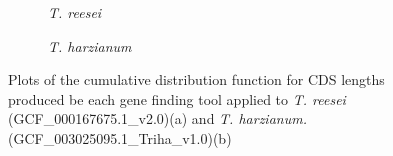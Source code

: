 \begin{figure}
  \centering
  \begin{subfigure}{\textwidth}
    \label{fig:treesei-lengths}
    \caption{\textit{T. reesei}}
  \end{subfigure}
  \begin{subfigure}{\textwidth}
    \label{fig:tharzianum-lengths}
    \caption{\textit{T. harzianum}}
  \end{subfigure}
  \caption[CDF plots for \textit{T. harzianum} and \textit{T. reesei}]{Plots of the cumulative distribution
    function for CDS lengths produced be each gene finding tool
    applied to \textit{T. reesei} (GCF\_000167675.1\_v2.0)(a) and
    \textit{T. harzianum.} (GCF\_003025095.1\_Triha\_v1.0)(b)}\label{fig:cdf-lengths-2}
\end{figure}


